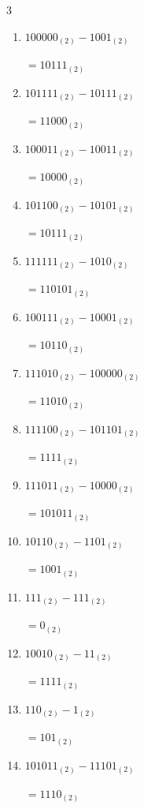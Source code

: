 \begin{multicols}{3}
\begin{enumerate}
\columnbreak %

  \item $100000_{(2)} - 1001_{(2)}$

        $=10111_{(2)}$

  \item $101111_{(2)} - 10111_{(2)}$

        $=11000_{(2)}$

  \item $100011_{(2)} - 10011_{(2)}$

        $=10000_{(2)}$

  \item $101100_{(2)} - 10101_{(2)}$

        $=10111_{(2)}$

  \item $111111_{(2)} - 1010_{(2)}$

        $=110101_{(2)}$

  \item $100111_{(2)} - 10001_{(2)}$

        $=10110_{(2)}$

  \item $111010_{(2)} - 100000_{(2)}$

        $=11010_{(2)}$

  \item $111100_{(2)} - 101101_{(2)}$

        $=1111_{(2)}$

  \item $111011_{(2)} - 10000_{(2)}$

        $=101011_{(2)}$

  \item $10110_{(2)} - 1101_{(2)}$

        $=1001_{(2)}$

\columnbreak %

  \item $111_{(2)} - 111_{(2)}$

        $=0_{(2)}$

  \item $10010_{(2)} - 11_{(2)}$

        $=1111_{(2)}$

  \item $110_{(2)} - 1_{(2)}$

        $=101_{(2)}$

  \item $101011_{(2)} - 11101_{(2)}$

        $=1110_{(2)}$


\end{enumerate}
\end{multicols}
